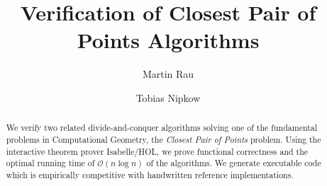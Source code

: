 \documentclass{llncs}
\begin{document}
\title{Verification of Closest Pair of Points Algorithms}
\author{Martin Rau \and Tobias Nipkow}
\date{}
\maketitle

\begin{abstract}
We verify two related divide-and-conquer algorithms solving one of the fundamental problems
in Computational Geometry, the \textit{Closest Pair of Points} problem.
Using the interactive theorem prover Isabelle/HOL, we prove functional correctness
and the optimal running time of $\mathcal{O}(n \log n)$ of the algorithms. 
We generate executable code which is empirically competitive with handwritten
reference implementations.
\end{abstract}





\end{document}
